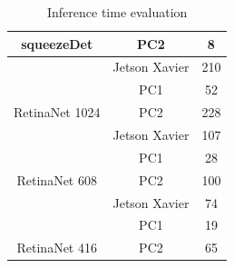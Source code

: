 \documentclass[twoside]{ctuthesis}
\theoremstyle{plain}
\theoremstyle{definition}
\theoremstyle{note}
\begin{document}
\begin{table}[hbt]
\begin{tabular}{|c|c|c|}
\multirow{-3}{*}{squeezeDet}                             & PC2                                                        & 8                                                                          \\ \hline
                                                         & Jetson Xavier                                              & 210                                                                        \\ \cline{2-3} 
                                                         & PC1                                                        & 52                                                                         \\ \cline{2-3} 
\multirow{-3}{*}{RetinaNet 1024}                      & PC2                                                        & 228                                                                        \\ \hline
                                                         & Jetson Xavier                                              & 107                                                                        \\ \cline{2-3} 
                                                         & PC1                                                        & 28                                                                         \\ \cline{2-3} 
\multirow{-3}{*}{RetinaNet 608}                       & PC2                                                        & 100                                                                        \\ \hline
                                                         & Jetson Xavier                                              & 74                                                                         \\ \cline{2-3} 
                                                         & PC1                                                        & 19                                                                         \\ \cline{2-3} 
\multirow{-3}{*}{RetinaNet 416}                       & PC2                                                        & 65                                                                         \\ \hline
\end{tabular}
\caption{Inference time evaluation}
\label{inference_time}
\end{table}
\end{document}

